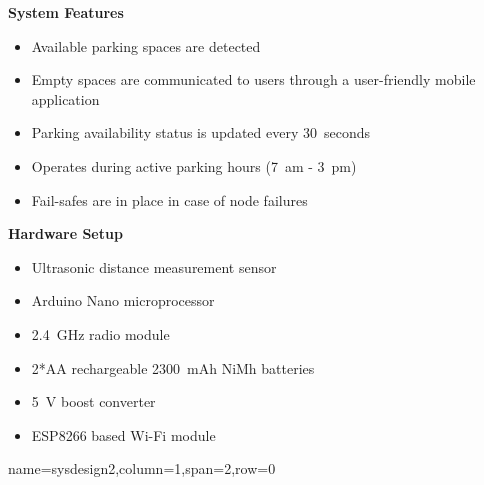 \documentclass[landscape,a1paper,fontscale=0.47]{baposter} %
\newcommand{\compresslist}{ %
\setlength{\itemsep}{1pt}
\setlength{\parskip}{0pt}
\setlength{\parsep}{0pt}
}
\begin{document}
\begin{poster}
{	\textbf{System Features}
		\begin{itemize}[leftmargin=13pt]\compresslist
			\item Available parking spaces are detected
			\item Empty spaces are communicated to users through a user-friendly mobile application
			\item Parking availability status is updated every 30~seconds
			\item Operates during active parking hours (7~am - 3~pm)
			\item Fail-safes are in place in case of node failures
		\end{itemize}
	
	\textbf{Hardware Setup}
		\begin{itemize}[leftmargin=13pt]\compresslist
			\item Ultrasonic distance measurement sensor
			\item Arduino Nano microprocessor
			\item 2.4~GHz radio module
			\item 2*AA rechargeable 2300~mAh NiMh batteries
			\item 5~V boost converter
			\item ESP8266 based Wi-Fi module
		\end{itemize}

}

{name=sysdesign2,column=1,span=2,row=0}{%
	\begin{multicols}{2}
		

\end{multicols}}
\end{poster}
\end{document}
